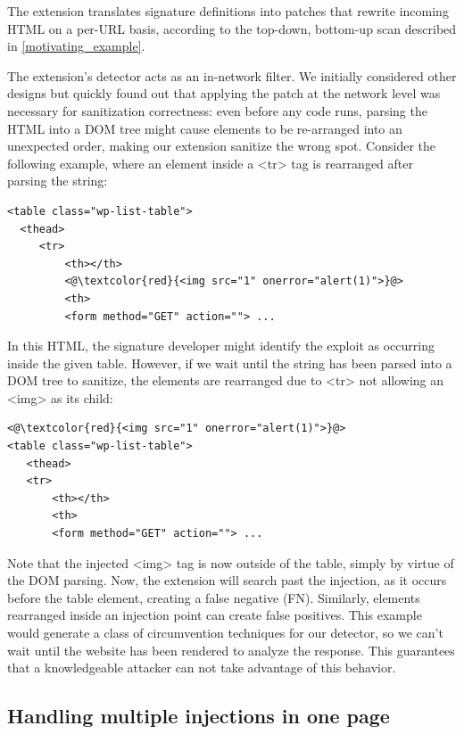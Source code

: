  The extension translates signature definitions into patches that
 rewrite incoming HTML on a per-URL basis, according to the top-down,
 bottom-up scan described in \autoref{motivating_example}.
 
 The extension's detector acts as an in-network filter. We initially considered other designs but quickly found out that applying the patch at the network level was necessary for sanitization correctness: even before any code runs, parsing the HTML into a DOM tree
might cause elements to be re-arranged into an unexpected order,
making our extension sanitize the wrong spot.  Consider the following
example, where an element inside a <tr> tag is rearranged after
parsing the string:
\vspace{-0.2cm}
\begin{lstlisting}
<table class="wp-list-table">
  <thead>
     <tr>
	     <th></th>
	     <@\textcolor{red}{<img src="1" onerror="alert(1)">}@>
	     <th>
   	     <form method="GET" action=""> ...
\end{lstlisting}

In this HTML, the signature developer might identify the exploit as
occurring inside the given table. However, if we wait until the string
has been parsed into a DOM tree to sanitize, the elements are
rearranged due to <tr> not allowing an <img> as its child:
\vspace{-0.2cm}
\begin{lstlisting}
<@\textcolor{red}{<img src="1" onerror="alert(1)">}@>
<table class="wp-list-table">
   <thead>
   <tr>
	   <th></th>
	   <th>
       <form method="GET" action=""> ...
\end{lstlisting}

Note that the injected <img> tag is now outside of the table, simply
by virtue of the DOM parsing. Now, the extension will search past the
injection, as it occurs before the table element, creating a false
negative (FN). Similarly, elements rearranged inside an injection
point can create false positives. This example would generate a class
of circumvention techniques for our detector, so we can't wait until
the website has been rendered to analyze the response. This guarantees
that a knowledgeable attacker can not take advantage of this
behavior.

\subsection{Handling multiple injections in one page} \label{multiple_injections}

